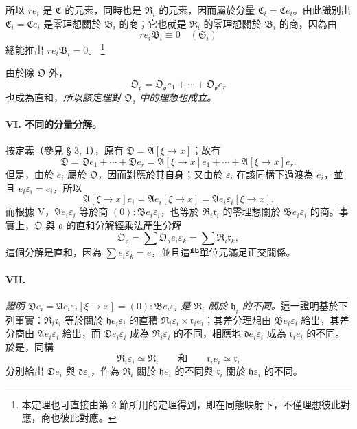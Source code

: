 \documentclass[11pt]{article}
\providecommand{\srcfn}[2]{%
  \begingroup
  \renewcommand{\thefootnote}{#1}%
  \footnote{#2}%
  \addtocounter{footnote}{-1}%
  \endgroup}
\begin{document}
所以 $r e_i$ 是 $\mathfrak C$ 的元素，同時也是 $\mathfrak R_i$ 的元素，因而屬於分量 $\mathfrak C_i=\mathfrak C e_i$。由此識別出 $\mathfrak C_i=\mathfrak C e_i$ 是零理想關於 $\mathfrak B_i$ 的商；它也就是 $\mathfrak R_i$ 的零理想關於 $\mathfrak B_i$ 的商，因為由
\[
r e_i\mathfrak B_i\equiv0\quad(\mathfrak S_i)
\]
總能推出 $r e_i\mathfrak B_i=0$。\srcfn{14)}{本定理也可直接由第 2 節所用的定理得到，即在同態映射下，不僅理想彼此對應，商也彼此對應。}由於除 $\mathfrak O$ 外，
\[
\mathfrak O_{\mathfrak o}=\mathfrak O_{\mathfrak o}e_1+\cdots+\mathfrak O_{\mathfrak o}e_r
\]
也成為直和，\emph{所以該定理對 $\mathfrak O_{\mathfrak o}$ 中的理想也成立。}

\paragraph{VI. 不同的分量分解。}
按定義（參見 § 3, 1），原有 $\mathfrak D=\mathfrak A[\xi\to x]$；故有
\[
\mathfrak D=\mathfrak D e_1+\cdots+\mathfrak D e_r
=\mathfrak A[\xi\to x]e_1+\cdots+\mathfrak A[\xi\to x]e_r.
\]
但是，由於 $e_i$ 屬於 $\mathfrak O$，因而對應於其自身；又由於 $\varepsilon_i$ 在該同構下過渡為 $e_i$，並且 $e_i\varepsilon_i=e_i$，所以
\[
\mathfrak A[\xi\to x]e_i=\mathfrak A e_i[\xi\to x]
=\mathfrak A e_i\varepsilon_i[\xi\to x].
\]
而根據 V，$\mathfrak A e_i\varepsilon_i$ 等於商 $(0):\mathfrak B e_i\varepsilon_i$，也等於 $\mathfrak R_i\mathfrak r_i$ 的零理想關於 $\mathfrak B e_i\varepsilon_i$ 的商。事實上，$\mathfrak O$ 與 $\mathfrak o$ 的直和分解經乘法產生分解
\[
\mathfrak O_{\mathfrak o}=\sum\mathfrak O_{\mathfrak o}e_i\varepsilon_k
=\sum\mathfrak R_i\mathfrak r_k,
\]
這個分解是直和，因為 $\sum e_i\varepsilon_k=e$，並且這些單位元滿足正交關係。

\paragraph{VII.}
\emph{證明 $\mathfrak D e_i=\mathfrak A e_i\varepsilon_i[\xi\to x]=(0):\mathfrak B e_i\varepsilon_i$ 是 $\mathfrak R_i$ 關於 $\mathfrak h_i$ 的不同。}這一證明基於下列事實：$\mathfrak R_i\mathfrak r_i$ 等於關於 $\mathfrak h e_i\varepsilon_i$ 的直積 $\mathfrak R_i\varepsilon_i\times\mathfrak r_i e_i$；其差分理想由 $\mathfrak B e_i\varepsilon_i$ 給出，其差分商由 $\mathfrak A e_i\varepsilon_i$ 給出，而 $\mathfrak D e_i\varepsilon_i$ 成為 $\mathfrak R_i\varepsilon_i$ 的不同，相應地 $\mathfrak d e_i\varepsilon_i$ 成為 $\mathfrak r_i e_i$ 的不同。於是，同構
\[
\mathfrak R_i\varepsilon_i\simeq\mathfrak R_i
\qquad\text{和}\qquad
\mathfrak r_i e_i\simeq\mathfrak r_i
\]
分別給出 $\mathfrak D e_i$ 與 $\mathfrak d\varepsilon_i$，作為 $\mathfrak R_i$ 關於 $\mathfrak h e_i$ 的不同與 $\mathfrak r_i$ 關於 $\mathfrak h\varepsilon_i$ 的不同。
\end{document}
